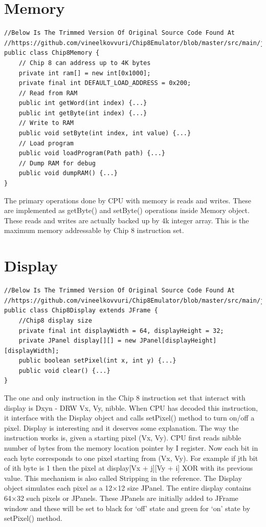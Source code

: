 \documentclass{article}
\begin{document}
\section{Memory}
\begin{verbatim}
//Below Is The Trimmed Version Of Original Source Code Found At
//https://github.com/vineelkovvuri/Chip8Emulator/blob/master/src/main/java/com/vineelkumarreddy/chip8/Chip8Memory.java
public class Chip8Memory {
    // Chip 8 can address up to 4K bytes
    private int ram[] = new int[0x1000];
    private final int DEFAULT_LOAD_ADDRESS = 0x200;
    // Read from RAM
    public int getWord(int index) {...}
    public int getByte(int index) {...}
    // Write to RAM
    public void setByte(int index, int value) {...}
    // Load program
    public void loadProgram(Path path) {...}
    // Dump RAM for debug
    public void dumpRAM() {...}
}
\end{verbatim}
The primary operations done by CPU with memory is reads and writes. These are implemented as getByte() and setByte() operations inside Memory object. These reads and writes are actually backed up by 4k integer array. This is the maximum memory addressable by Chip 8 instruction set.

\section{Display}
\begin{verbatim}
//Below Is The Trimmed Version Of Original Source Code Found At
//https://github.com/vineelkovvuri/Chip8Emulator/blob/master/src/main/java/com/vineelkumarreddy/chip8/Chip8Display.java
public class Chip8Display extends JFrame {
    //Chip8 display size
    private final int displayWidth = 64, displayHeight = 32;
    private JPanel display[][] = new JPanel[displayHeight][displayWidth];
    public boolean setPixel(int x, int y) {...}
    public void clear() {...}
}
\end{verbatim}
The one and only instruction in the Chip 8 instruction set that interact with display is Dxyn - DRW Vx, Vy, nibble. When CPU has decoded this instruction, it interface with the Display object and calls setPixel() method to turn on/off a pixel. Display is interesting and it deserves some explanation. The way the instruction works is, given a starting pixel (Vx, Vy). CPU first reads nibble number of bytes from the memory location pointer by I register. Now each bit in each byte corresponds to one pixel starting from (Vx, Vy). For example if jth bit of ith byte is 1 then the pixel at display[Vx + j][Vy + i] XOR with its previous value. This mechanism is also called  Stripping in the reference. The Display object simulates each pixel as a 12×12 size JPanel. The entire display contains 64×32 such pixels or JPanels. These JPanels are initially added to JFrame window and these will be set to black for ‘off’ state and green for ‘on’ state by setPixel() method.
\end{document}
